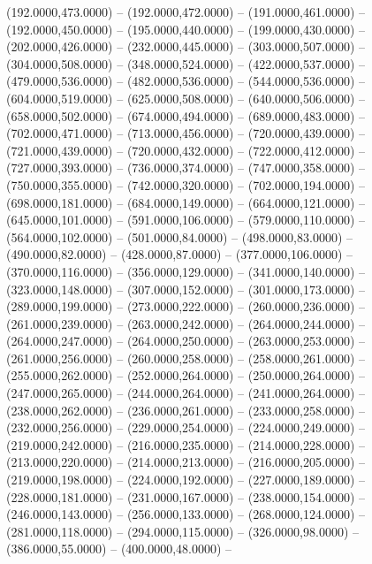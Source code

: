 \begin{scope}[shift={(-190.875,-10.875)}]
  \begin{scope}[draw=black,fill=c0f7296,line join=round,line width=0.208pt]
       (192.0000,473.0000) -- (192.0000,472.0000) --
        (191.0000,461.0000) -- (192.0000,450.0000) -- (195.0000,440.0000) --
        (199.0000,430.0000) -- (202.0000,426.0000) -- (232.0000,445.0000) --
        (303.0000,507.0000) -- (304.0000,508.0000) -- (348.0000,524.0000) --
        (422.0000,537.0000) -- (479.0000,536.0000) -- (482.0000,536.0000) --
        (544.0000,536.0000) -- (604.0000,519.0000) -- (625.0000,508.0000) --
        (640.0000,506.0000) -- (658.0000,502.0000) -- (674.0000,494.0000) --
        (689.0000,483.0000) -- (702.0000,471.0000) -- (713.0000,456.0000) --
        (720.0000,439.0000) -- (721.0000,439.0000) -- (720.0000,432.0000) --
        (722.0000,412.0000) -- (727.0000,393.0000) -- (736.0000,374.0000) --
        (747.0000,358.0000) -- (750.0000,355.0000) -- (742.0000,320.0000) --
        (702.0000,194.0000) -- (698.0000,181.0000) -- (684.0000,149.0000) --
        (664.0000,121.0000) -- (645.0000,101.0000) -- (591.0000,106.0000) --
        (579.0000,110.0000) -- (564.0000,102.0000) -- (501.0000,84.0000) --
        (498.0000,83.0000) -- (490.0000,82.0000) -- (428.0000,87.0000) --
        (377.0000,106.0000) -- (370.0000,116.0000) -- (356.0000,129.0000) --
        (341.0000,140.0000) -- (323.0000,148.0000) -- (307.0000,152.0000) --
        (301.0000,173.0000) -- (289.0000,199.0000) -- (273.0000,222.0000) --
        (260.0000,236.0000) -- (261.0000,239.0000) -- (263.0000,242.0000) --
        (264.0000,244.0000) -- (264.0000,247.0000) -- (264.0000,250.0000) --
        (263.0000,253.0000) -- (261.0000,256.0000) -- (260.0000,258.0000) --
        (258.0000,261.0000) -- (255.0000,262.0000) -- (252.0000,264.0000) --
        (250.0000,264.0000) -- (247.0000,265.0000) -- (244.0000,264.0000) --
        (241.0000,264.0000) -- (238.0000,262.0000) -- (236.0000,261.0000) --
        (233.0000,258.0000) -- (232.0000,256.0000) -- (229.0000,254.0000) --
        (224.0000,249.0000) -- (219.0000,242.0000) -- (216.0000,235.0000) --
        (214.0000,228.0000) -- (213.0000,220.0000) -- (214.0000,213.0000) --
        (216.0000,205.0000) -- (219.0000,198.0000) -- (224.0000,192.0000) --
        (227.0000,189.0000) -- (228.0000,181.0000) -- (231.0000,167.0000) --
        (238.0000,154.0000) -- (246.0000,143.0000) -- (256.0000,133.0000) --
        (268.0000,124.0000) -- (281.0000,118.0000) -- (294.0000,115.0000) --
        (326.0000,98.0000) -- (386.0000,55.0000) -- (400.0000,48.0000) --

\end{scope}
\end{scope}
